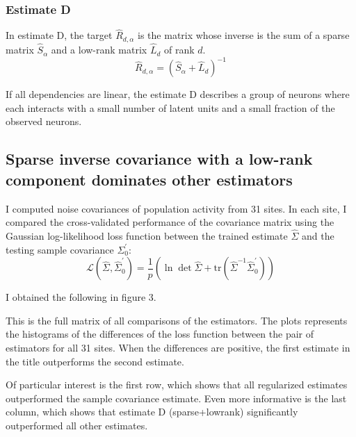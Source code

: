 \subsubsection*{Estimate D}
In estimate D, the target $\hat R_{d,\alpha}$ is the matrix whose inverse is the sum of a sparse matrix $\hat S_\alpha$ and a low-rank matrix $\hat L_d$ of rank $d$.
\begin{equation}
\hat R_{d,\alpha} = (\hat S_\alpha + \hat L_d)^{-1}
\end{equation}

If all dependencies are linear, the estimate D describes a group of neurons where each interacts with a small number of latent units and a small fraction of the observed neurons. 

\subsection*{Sparse inverse covariance with a low-rank component dominates other estimators}
I computed noise covariances of population activity from 31 sites.  In each site, I compared the cross-validated performance of the covariance matrix using the Gaussian log-likelihood loss function between the trained estimate $ \hat\Sigma$ and the testing sample covariance $ \Sigma_0^\prime$:
\begin{equation}
\mathcal L(\hat\Sigma,\hat\Sigma_0^\prime) = 
\frac 1 p\left( \ln \det \hat \Sigma + \mbox{tr}(\hat \Sigma^{-1}\hat\Sigma_0^\prime) \right) 
\end{equation}

I obtained the following in figure 3.

This is the full matrix of all comparisons of the estimators.  The plots represents the histograms of the differences of the loss function between the pair of estimators for all 31 sites.  When the differences are positive, the first estimate in the title outperforms the second estimate.

Of particular interest is the first row, which shows that all regularized estimates  outperformed the sample covariance estimate.  Even more informative is the last column, which shows that estimate D (sparse+lowrank) significantly outperformed all other estimates.



